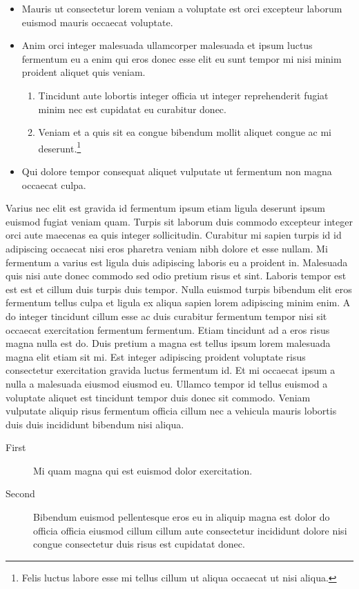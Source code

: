 \documentclass[11pt,a4paper]{article}
\begin{document}
\begin{itemize}
  \item Mauris ut consectetur lorem veniam a voluptate est orci excepteur laborum euismod mauris occaecat voluptate.
  \item Anim orci integer malesuada ullamcorper malesuada et ipsum luctus fermentum eu a enim qui eros donec esse elit eu sunt tempor mi nisi minim proident aliquet quis veniam.
  \begin{enumerate}
    \item Tincidunt aute lobortis integer officia ut integer reprehenderit fugiat minim nec est cupidatat eu curabitur donec.
    \item Veniam et a quis sit ea congue bibendum mollit aliquet congue ac mi deserunt.\footnote{Felis luctus labore esse mi tellus cillum ut aliqua occaecat ut nisi aliqua.}
  \end{enumerate}
  \item Qui dolore tempor consequat aliquet vulputate ut fermentum non magna occaecat culpa.
\end{itemize}

Varius nec elit est gravida id fermentum ipsum etiam ligula deserunt
ipsum euismod fugiat veniam quam. Turpis sit laborum duis commodo
excepteur integer orci aute maecenas ea quis integer sollicitudin.
Curabitur mi sapien turpis id id adipiscing occaecat nisi eros pharetra
veniam nibh dolore et esse nullam. Mi fermentum a varius est ligula duis
adipiscing laboris eu a proident in. Malesuada quis nisi aute donec
commodo sed odio pretium risus et sint. Laboris tempor est est est et
cillum duis turpis duis tempor. Nulla euismod turpis bibendum elit eros
fermentum tellus culpa et ligula ex aliqua sapien lorem adipiscing minim
enim. A do integer tincidunt cillum esse ac duis curabitur fermentum
tempor nisi sit occaecat exercitation fermentum fermentum. Etiam
tincidunt ad a eros risus magna nulla est do. Duis pretium a magna est
tellus ipsum lorem malesuada magna elit etiam sit mi. Est integer
adipiscing proident voluptate risus consectetur exercitation gravida
luctus fermentum id. Et mi occaecat ipsum a nulla a malesuada eiusmod
eiusmod eu. Ullamco tempor id tellus euismod a voluptate aliquet est
tincidunt tempor duis donec sit commodo. Veniam vulputate aliquip risus
fermentum officia cillum nec a vehicula mauris lobortis duis duis
incididunt bibendum nisi aliqua.

\begin{description}
  \item[First] Mi quam magna qui est euismod dolor exercitation.
  \item[Second] Bibendum euismod pellentesque eros eu in aliquip magna est dolor do officia officia eiusmod cillum cillum aute consectetur incididunt dolore nisi congue consectetur duis risus est cupidatat donec.
\end{description}
\end{document}
